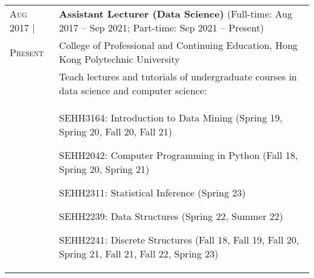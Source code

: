\documentclass[10pt, oneside]{article}
\begin{document}
\begin{tabularx}{\linewidth}{p{2.2cm}|p{16cm}}
	\textsc{Aug} 2017 | & \textbf{Assistant Lecturer (Data Science)}  (Full-time: Aug 2017 -- Sep 2021; Part-time: Sep 2021 -- Present) \\
	\textsc{Present} & College of Professional and Continuing Education, Hong Kong Polytechnic University\\
	& Teach lectures and tutorials of undergraduate courses in data science and computer science:\\
	&	\begin{itemize}
		\vspace{0.1cm}
		\footnotesize{
			\item SEHH3164: Introduction to Data Mining (Spring 19, Spring 20, Fall 20, Fall 21)
			\item SEHH2042: Computer Programming in Python (Fall 18, Spring 20, Spring 21)
			\item SEHH2311: Statistical Inference (Spring 23)
			\item SEHH2239: Data Structures (Spring 22, Summer 22)
			\item SEHH2241: Discrete Structures (Fall 18, Fall 19, Fall 20, Spring 21, Fall 21, Fall 22, Spring 23)
}
\end{itemize}
\end{tabularx}
\end{document}
